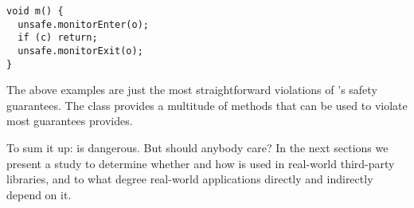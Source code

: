 \begin{lstlisting}[style=java,caption=\smu{} can lead to monitor deadlocks]
void m() {
  unsafe.monitorEnter(o);
  if (c) return;
  unsafe.monitorExit(o);
}
\end{lstlisting}

The above examples are just the most straightforward violations of
\java{}'s safety guarantees.
The \smu{} class provides a multitude of methods that can be used
to violate most guarantees \java{} provides.

To sum it up: \unsafe{} is dangerous.
But should anybody care?
In the next sections we present a study to determine whether and how
\unsafe{} is used in real-world third-party \java{} libraries,
and to what degree real-world applications directly and indirectly
depend on it.